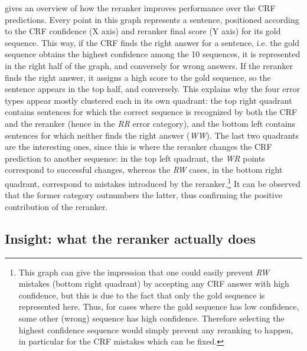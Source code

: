 \documentclass[output=paper
,modfonts
,nonflat]{langsci/langscibook}
\begin{document}



 gives an overview of how
the reranker improves performance over the CRF predictions. Every
point in this graph represents a sentence, positioned according to the
CRF confidence (X axis) and reranker final score (Y axis) for its gold
sequence. This way, if the CRF finds the right answer for a sentence,
i.e. the gold sequence obtains the highest confidence among the 10
sequences, it is represented in the right half of the graph, and
conversely for wrong answers. If the reranker finds the right answer,
it assigns a high score to the gold sequence, so the sentence appears
in the top half, and conversely. This explains why the four error
types appear mostly clustered each in its own quadrant: the top right
quadrant contains sentences for which the correct sequence is
recognized by both the CRF and the reranker (hence in the {\it RR}
error category), and the bottom left contains sentences for which
neither finds the right answer ({\it WW}). The last two quadrants are
the interesting ones, since this is where the reranker changes the CRF
prediction to another sequence: in the top left quadrant, the {\it WR} points
correspond to successful changes, whereas the {\it RW} cases, in the
bottom right quadrant, correspond to mistakes introduced by the
reranker.\footnote{This graph can give the impression that one could
  easily prevent {\it RW} mistakes (bottom right quadrant) by
  accepting any CRF answer with high confidence, but this is due to
  the fact that only the gold sequence is represented here. Thus, for
  cases where the gold sequence has low confidence, some other (wrong)
  sequence has high confidence. Therefore selecting the highest
  confidence sequence would simply prevent any reranking to happen, in
  particular for the CRF mistakes which can be fixed.} It can be
observed that the former category outnumbers the latter, thus
confirming the positive contribution of the reranker.





\subsection{Insight: what the reranker actually does}
\end{document}

